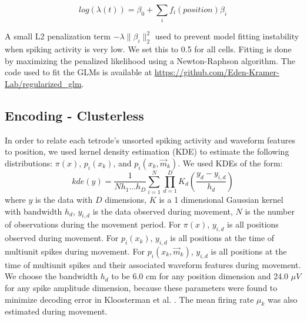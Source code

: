 \documentclass[times, twoside]{zHenriquesLab-StyleBioRxiv}
\begin{document}
$$log(\lambda(t)) = \beta_{0} + \sum_{i} f_{i}(position)\beta_{i}$$

A small L2 penalization term $-\lambda\|\beta_{i}\|_{2}^{2}$ used to prevent model fitting instability when spiking activity is very low. We set this to 0.5 for all cells. Fitting is done by maximizing the penalized likelihood using a Newton-Raphson algorithm. The code used to fit the GLMs is available at \url{https://github.com/Eden-Kramer-Lab/regularized_glm}.

\subsection*{Encoding - Clusterless}
In order to relate each tetrode's unsorted spiking activity and waveform features to position, we used kernel density estimation (KDE) to estimate the following distributions: $\pi(x)$, $p_{i}(x_k)$, and $p_{i}(x_k, \vec{m}_k)$. We used KDEs of the form: 
$$
kde(y) = \frac{1}{N h_1...h_D} \sum^{N}_{i=1} \prod^{D}_{d=1} K_{d}\left(\frac{y_d - y_{i,d}}{h_d}\right)
$$
where $y$ is the data with $D$ dimensions, $K$ is a 1 dimensional Gaussian kernel with bandwidth $h_d$, $y_{i, d}$ is the data observed during movement, $N$ is the number of observations during the movement period. For $\pi(x)$, $y_{i, d}$ is all positions observed during movement. For $p_{i}(x_k)$, $y_{i, d}$ is all positions at the time of multiunit spikes during movement. For $p_{i}(x_k, \vec{m}_k)$, $y_{i, d}$ is all positions at the time of multiunit spikes and their associated waveform features during movement. We choose the bandwidth $h_d$ to be 6.0 cm for any position dimension and 24.0 $\mu V$ for any spike amplitude dimension, because these parameters were found to minimize decoding error in Kloosterman et al. \cite{KloostermanBayesiandecodingusing2014}. The mean firing rate $\mu_k$ was also estimated during movement.
\end{document}

